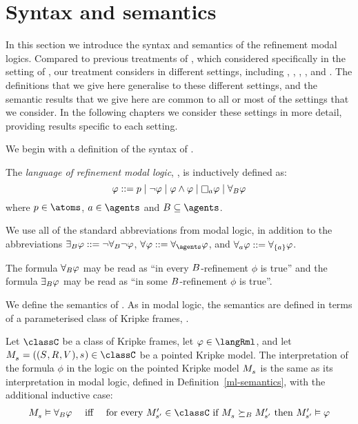 \section{Syntax and semantics}\label{rml-semantics}

In this section we introduce the syntax and semantics of the refinement modal logics.
Compared to previous treatments of \logicRml{}, which considered \logicRml{} specifically in the setting of \classK{}, our treatment considers \logicRml{} in different settings, including \classK{}, \classKFF{}, \classKD{}, \classS{}, and \classKF{}.
The definitions that we give here generalise to these different settings, and the semantic results that we give here are common to all or most of the settings that we consider.
In the following chapters we consider these settings in more detail, providing results specific to each setting.

We begin with a definition of the syntax of \logicRml{}.

\begin{definition}
The {\em language of refinement modal logic}, \langRml{}, is inductively defined as:
$$
\phi ::= 
    \atomP \mid
    \lnot \phi \mid
    \phi \land \phi \mid
    \necessaryA \phi \mid
    \allrefsBs \phi
$$
where $\atomP \in \atoms$, $\agentA \in \agents$ and $\agentsB \subseteq \agents$.
\end{definition}

We use all of the standard abbreviations from modal logic, in addition to the abbreviations $\somerefsBs \phi ::= \lnot \allrefsBs \lnot \phi$, $\allrefs \phi ::= \allrefsAs \phi$, and $\allrefsA \phi ::= \allrefs[\{\agentA\}] \phi$.

The formula $\allrefsBs \phi$ may be read as ``in every $\agentsB$-refinement $\phi$ is true'' and the formula $\somerefsBs \phi$ may be read as ``in some $\agentsB$-refinement $\phi$ is true''.

We define the semantics of \logicRml{}.
As in modal logic, the semantics are defined in terms of a parameterised class of Kripke frames, \classC{}.

\begin{definition}
Let $\classC$ be a class of Kripke frames, let $\phi \in \langRml$, and let $\kPModelAndTuple{\kStateS} \in \classC$ be a pointed Kripke model.
The interpretation of the formula $\phi$ in the logic \logicRmlC{} on the pointed Kripke model $\kPModel{\kStateS}$ is the same as its interpretation in modal logic, defined in Definition~\ref{ml-semantics}, with the additional inductive case:
$$
\begin{array}{lcl}
    \kPModel{\kStateS} \entails \allrefsBs \phi & \text{ iff } & \text{for every } \kPModelP{\kStateSP} \in \classC \text{ if } \kPModel{\kStateS} \simulatesBs \kPModelP{\kStateSP} \text{ then } \kPModelP{\kStateSP} \entails \phi
\end{array}
$$
\end{definition}

